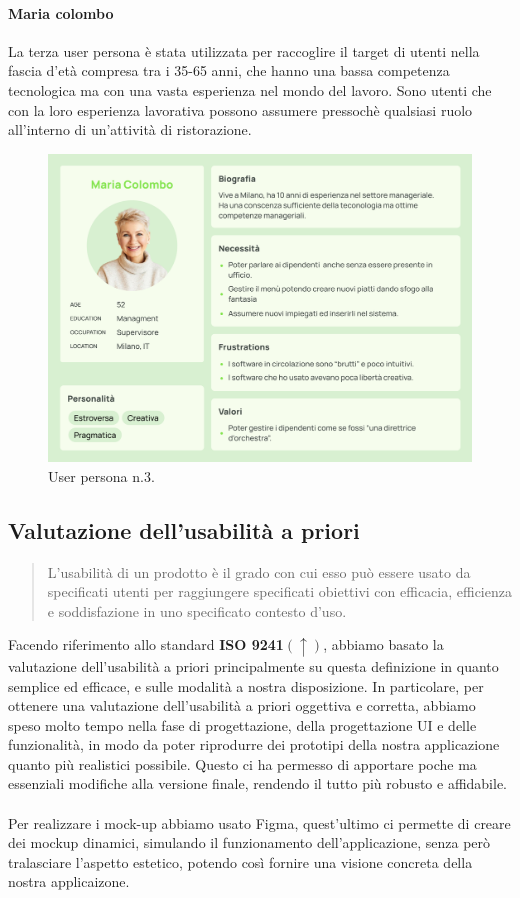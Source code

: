 \paragraph{Maria colombo}
La terza user persona è stata utilizzata per raccoglire il target di utenti nella fascia d'età compresa tra i 35-65 anni, che hanno una bassa competenza tecnologica ma con una vasta esperienza nel mondo del lavoro. Sono utenti che con la loro esperienza lavorativa possono assumere pressochè qualsiasi ruolo all'interno di un'attività di ristorazione.

\begin{figure}[H]
  \centering
  \includegraphics[scale=0.25]{img/personas/Maria_colombo_persona.png}
  \caption{User persona n.3.}
\end{figure}\newpage
\subsection{Valutazione dell'usabilità a priori}
\begin{quote}
  L'usabilità di un prodotto è il grado con cui esso può essere usato da specificati utenti per raggiungere specificati obiettivi con efficacia, efficienza e soddisfazione in uno specificato contesto d'uso.
\end{quote}
Facendo riferimento allo standard \textbf{ISO 9241}$(\uparrow)$, abbiamo basato la valutazione dell'usabilità a priori principalmente su questa definizione in quanto semplice ed efficace, e sulle modalità a nostra disposizione. 
\newline
In particolare, per ottenere una valutazione dell'usabilità a priori oggettiva e corretta, abbiamo speso molto tempo nella fase di progettazione,  della progettazione UI
e delle funzionalità, in modo da poter riprodurre dei prototipi della nostra applicazione quanto più realistici possibile. Questo ci ha permesso di apportare poche ma essenziali modifiche alla versione finale, rendendo il tutto più robusto e affidabile.
\\
\\
Per realizzare i mock-up abbiamo usato Figma, quest'ultimo ci permette di
creare dei mockup dinamici, simulando il funzionamento dell'applicazione, senza però tralasciare l'aspetto estetico, potendo così fornire una visione concreta della nostra applicaizone.
